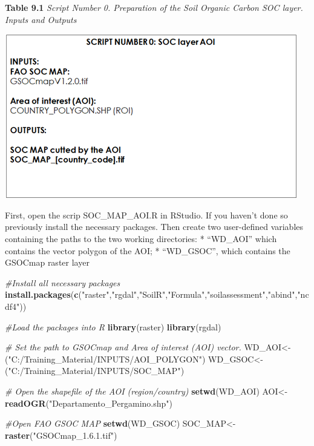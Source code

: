 \documentclass[
  10pt,
  b5paper,
]{book}
\newenvironment{Shaded}{\begin{snugshade}}{\end{snugshade}}
\newcommand{\CommentTok}[1]{\textcolor[rgb]{0.56,0.35,0.01}{\textit{#1}}}
\newcommand{\KeywordTok}[1]{\textcolor[rgb]{0.13,0.29,0.53}{\textbf{#1}}}
\newcommand{\NormalTok}[1]{#1}
\newcommand{\StringTok}[1]{\textcolor[rgb]{0.31,0.60,0.02}{#1}}
\begin{document}
\textbf{Table 9.1} \emph{Script Number 0. Preparation of the Soil Organic Carbon SOC layer. Inputs and Outputs}

\includegraphics{tables/Table_9.0.png}

First, open the scrip SOC\_MAP\_AOI.R in RStudio. If you haven't done so previously install the necessary packages. Then create two user-defined variables containing the paths to the two working directories:
* ``WD\_AOI'' which contains the vector polygon of the AOI;
* ``WD\_GSOC'', which contains the GSOCmap raster layer

\begin{Shaded}
\begin{Highlighting}[]
\CommentTok{#Install all necessary packages}
\KeywordTok{install.packages}\NormalTok{(}\KeywordTok{c}\NormalTok{(}\StringTok{"raster"}\NormalTok{,}\StringTok{"rgdal"}\NormalTok{,}\StringTok{"SoilR"}\NormalTok{,}\StringTok{"Formula"}\NormalTok{,}\StringTok{"soilassessment"}\NormalTok{,}\StringTok{"abind"}\NormalTok{,}\StringTok{"ncdf4"}\NormalTok{))}

\CommentTok{#Load the packages into R}
\KeywordTok{library}\NormalTok{(raster)}
\KeywordTok{library}\NormalTok{(rgdal)}

\CommentTok{# Set the path to GSOCmap and Area of interest (AOI) vector.}
\NormalTok{WD_AOI<-(}\StringTok{"C:/Training_Material/INPUTS/AOI_POLYGON"}\NormalTok{)}
\NormalTok{WD_GSOC<-(}\StringTok{"C:/Training_Material/INPUTS/SOC_MAP"}\NormalTok{)}

\CommentTok{# Open the shapefile of the AOI (region/country)}
\KeywordTok{setwd}\NormalTok{(WD_AOI)}
\NormalTok{AOI<-}\KeywordTok{readOGR}\NormalTok{(}\StringTok{"Departamento_Pergamino.shp"}\NormalTok{)}

\CommentTok{#Open FAO GSOC MAP }
\KeywordTok{setwd}\NormalTok{(WD_GSOC)}
\NormalTok{SOC_MAP<-}\KeywordTok{raster}\NormalTok{(}\StringTok{"GSOCmap_1.6.1.tif"}\NormalTok{)}
\end{Highlighting}
\end{Shaded}
\end{document}
